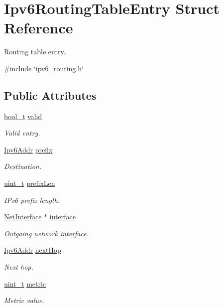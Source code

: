 \hypertarget{structIpv6RoutingTableEntry}{}\section{Ipv6\+Routing\+Table\+Entry Struct Reference}
\label{structIpv6RoutingTableEntry}


Routing table entry.  




{\ttfamily \#include \char`\"{}ipv6\+\_\+routing.\+h\char`\"{}}

\subsection*{Public Attributes}
\begin{DoxyCompactItemize}
\item 
\hyperlink{compiler__port_8h_a812d16e5494522586b3784e55d479912}{bool\+\_\+t} \hyperlink{structIpv6RoutingTableEntry_ae9580bbd1518a8088d3fd3782874a400}{valid}
\begin{DoxyCompactList}\small\item\em Valid entry. \end{DoxyCompactList}\item 
\hyperlink{ipv6_8h_aed0cbc40c61ed5b4fb681ebc55237e89}{Ipv6\+Addr} \hyperlink{structIpv6RoutingTableEntry_ad65e1df278c1729e94aa4fbf24a243e0}{prefix}
\begin{DoxyCompactList}\small\item\em Destination. \end{DoxyCompactList}\item 
\hyperlink{compiler__port_8h_a12a1e9b3ce141648783a82445d02b58d}{uint\+\_\+t} \hyperlink{structIpv6RoutingTableEntry_afa6df2620a8ea56487ec240f9ea38a81}{prefix\+Len}
\begin{DoxyCompactList}\small\item\em I\+Pv6 prefix length. \end{DoxyCompactList}\item 
\hyperlink{net_8h_a2234db8911a1148c9159979d8f5e0d6b}{Net\+Interface} $\ast$ \hyperlink{structIpv6RoutingTableEntry_ab13eefd552d99929780012e98e026a7d}{interface}
\begin{DoxyCompactList}\small\item\em Outgoing network interface. \end{DoxyCompactList}\item 
\hyperlink{ipv6_8h_aed0cbc40c61ed5b4fb681ebc55237e89}{Ipv6\+Addr} \hyperlink{structIpv6RoutingTableEntry_aca563bb1b384a2dd6eb5f52de10f79bb}{next\+Hop}
\begin{DoxyCompactList}\small\item\em Next hop. \end{DoxyCompactList}\item 
\hyperlink{compiler__port_8h_a12a1e9b3ce141648783a82445d02b58d}{uint\+\_\+t} \hyperlink{structIpv6RoutingTableEntry_a71c00d6422a11d1c5b060dcbd8f4f2c5}{metric}
\begin{DoxyCompactList}\small\item\em Metric value. \end{DoxyCompactList}\end{DoxyCompactItemize}


